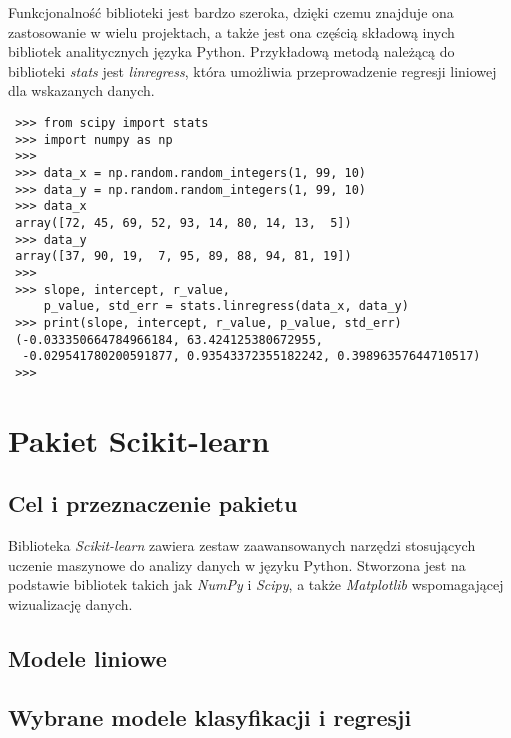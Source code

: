 Funkcjonalność biblioteki jest bardzo szeroka, dzięki czemu znajduje ona zastosowanie w wielu projektach, a także jest ona częścią składową inych bibliotek analitycznych języka Python.
Przykładową metodą należącą do biblioteki \textit{stats} jest \textit{linregress}, która umożliwia przeprowadzenie regresji liniowej dla wskazanych danych.
\begin{lstlisting}
 >>> from scipy import stats
 >>> import numpy as np
 >>>
 >>> data_x = np.random.random_integers(1, 99, 10)
 >>> data_y = np.random.random_integers(1, 99, 10)
 >>> data_x
 array([72, 45, 69, 52, 93, 14, 80, 14, 13,  5])
 >>> data_y
 array([37, 90, 19,  7, 95, 89, 88, 94, 81, 19])
 >>>
 >>> slope, intercept, r_value,
     p_value, std_err = stats.linregress(data_x, data_y)
 >>> print(slope, intercept, r_value, p_value, std_err)
 (-0.033350664784966184, 63.424125380672955,
  -0.029541780200591877, 0.93543372355182242, 0.39896357644710517)
 >>> 
\end{lstlisting}

\section{Pakiet Scikit-learn}

\subsection{Cel i przeznaczenie pakietu}
Biblioteka \textit{Scikit-learn} zawiera zestaw zaawansowanych narzędzi stosujących uczenie maszynowe do analizy danych w języku Python.
Stworzona jest na podstawie bibliotek takich jak \textit{NumPy} i \textit{Scipy}, a także \textit{Matplotlib} wspomagającej wizualizację danych.



\subsection{Modele liniowe}
\subsection{Wybrane modele klasyfikacji i regresji}
